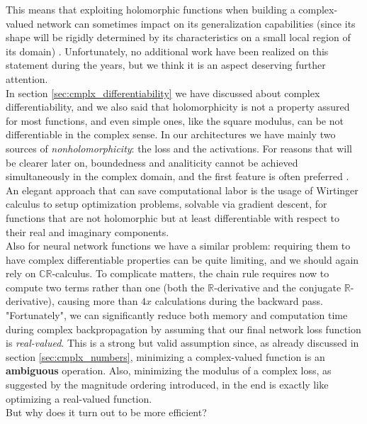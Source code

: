 \documentclass[../main.tex]{subfiles}
\begin{document}
This means that exploiting holomorphic functions when building a complex-valued network can sometimes impact on its generalization capabilities (since its shape will be rigidly determined by its characteristics on a small local region of its domain) \cite{hirose_cvnn}. Unfortunately, no additional work have been realized on this statement during the years, but we think it is an aspect deserving further attention.\\
In section \ref{sec:cmplx_differentiability} we have discussed about complex differentiability, and we also said that holomorphicity is not a property assured for most functions, and even simple ones, like the square modulus, can be not differentiable in the complex sense. In our architectures we have mainly two sources of \textit{nonholomorphicity}: the loss and the activations. For reasons that will be clearer later on, boundedness and analiticity cannot be achieved simultaneously in the complex domain, and the first feature is often preferred \cite{amin_wirtinger}.\\
An elegant approach that can save computational labor is the usage of Wirtinger calculus to setup optimization problems, solvable via gradient descent, for functions that are not holomorphic but at least differentiable with respect to their real and imaginary components.\\
Also for neural network functions we have a similar problem: requiring them to have complex differentiable properties can be quite limiting, and we should again rely on $\mathds{CR}$-calculus. To complicate matters, the chain rule requires now to compute two terms rather than one (both the $\mathds{R}$-derivative and the conjugate $\mathds{R}$-derivative), causing more than $4x$ calculations during the backward pass.\\
"Fortunately", we can significantly reduce both memory and computation time during complex backpropagation by assuming that our final network loss function is \textit{real-valued}. This is a strong but valid assumption since, as already discussed in section \ref{sec:cmplx_numbers}, minimizing a complex-valued function is an \textbf{ambiguous} operation. Also, minimizing the modulus of a complex loss, as suggested by the magnitude ordering introduced, in the end is exactly like optimizing a real-valued function.\\
But why does it turn out to be more efficient? 
\end{document}
